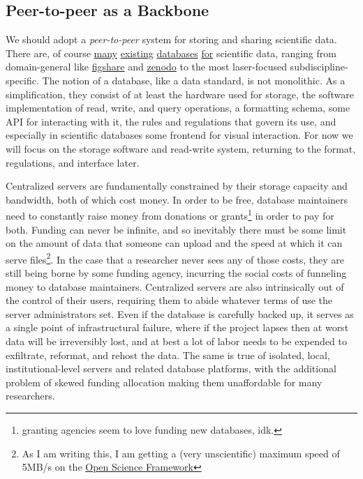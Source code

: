 \documentclass[10pt]{tufte-book}
\begin{document}
\subsection{Peer-to-peer as a
Backbone}

We should adopt a \emph{peer-to-peer} system for storing and sharing
scientific data. There are, of course
\href{https://www.dandiarchive.org/}{many}
\href{https://openneuro.org/}{existing}
\href{https://www.brainminds.riken.jp/}{databases}
\href{https://biccn.org/}{for} scientific data, ranging from
domain-general like \href{https://figshare.com/}{figshare} and
\href{https://zenodo.org/}{zenodo} to the most laser-focused
subdiscipline-specific. The notion of a database, like a data standard,
is not monolithic. As a simplification, they consist of at least the
hardware used for storage, the software implementation of read, write,
and query operations, a formatting schema, some API for interacting with
it, the rules and regulations that govern its use, and especially in
scientific databases some frontend for visual interaction. For now we
will focus on the storage software and read-write system, returning to
the format, regulations, and interface later.

Centralized servers are fundamentally constrained by their storage
capacity and bandwidth, both of which cost money. In order to be free,
database maintainers need to constantly raise money from donations or
grants\footnote{granting agencies seem to love funding new databases,
  idk.} in order to pay for both. Funding can never be infinite, and so
inevitably there must be some limit on the amount of data that someone
can upload and the speed at which it can serve files\footnote{As I am
  writing this, I am getting a (very unscientific) maximum speed of
  5MB/s on the \href{https://osf.io}{Open Science Framework}}. In the
case that a researcher never sees any of those costs, they are still
being borne by some funding agency, incurring the social costs of
funneling money to database maintainers. Centralized servers are also
intrinsically out of the control of their users, requiring them to abide
whatever terms of use the server administrators set. Even if the
database is carefully backed up, it serves as a single point of
infrastructural failure, where if the project lapses then at worst data
will be irreversibly lost, and at best a lot of labor needs to be
expended to exfiltrate, reformat, and rehost the data. The same is true
of isolated, local, institutional-level servers and related database
platforms, with the additional problem of skewed funding allocation
making them unaffordable for many researchers.
\end{document}
